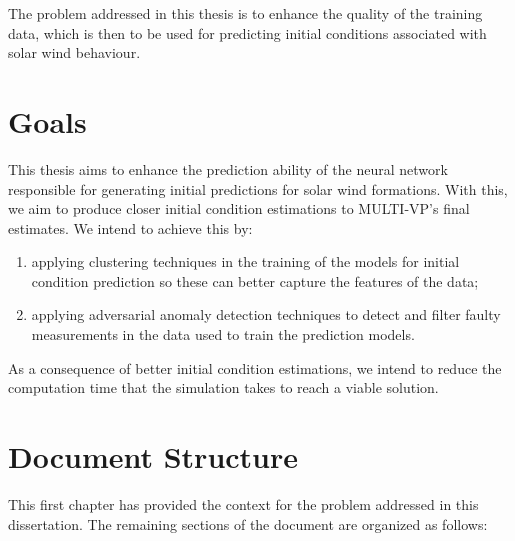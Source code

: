 The problem addressed in this thesis is to enhance the quality of the training data, which is then to be used for predicting initial conditions associated with solar wind behaviour.

\section{Goals}\label{sec:goals}
This thesis aims to enhance the prediction ability of the neural network \cite{barros_InitialConditionEstimation_} responsible for generating initial predictions for solar wind formations. With this, we aim to produce closer initial condition estimations to MULTI-VP's \cite{pinto.rouillard_MultipleFluxtubeSolar_2017} final estimates. We intend to achieve this by:

\begingroup
    \renewcommand\labelenumi{(\theenumi)}
    \begin{enumerate}
    \item applying clustering techniques in the training of the models for initial condition prediction so these can better capture the features of the data;
    \item applying adversarial anomaly detection techniques to detect and filter faulty measurements in the data used to train the prediction models.
\end{enumerate}
\endgroup


As a consequence of better initial condition estimations, we intend to reduce the computation time that the simulation takes to reach a viable solution.




\clearpage
\section{Document Structure}\label{sec:doc_struct}
This first chapter has provided the context for the problem addressed in this dissertation. The remaining sections of the document are organized as follows:

